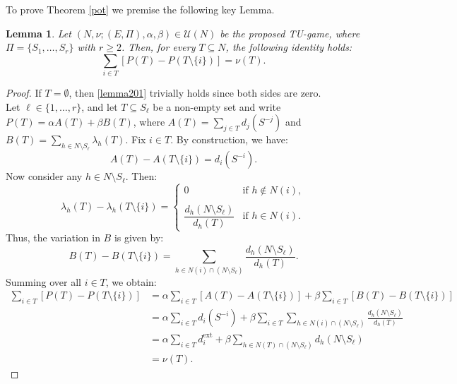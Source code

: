 \documentclass[preprint,11pt,authoryear]{elsarticle}
\theoremstyle{plain}
\newtheorem{lemma}[theorem]{Lemma}
\begin{document}
To prove Theorem \ref{pot} we premise the following 
key Lemma.
\begin{lemma}\label{lemmae2}
	Let \( (N, \nu; (E, \Pi), \alpha, \beta) \in \mathcal{U}(N) \) be the proposed TU-game, where \( \Pi = \{S_1, \dots, S_r\} \) with \( r \geq 2 \). Then, for every \( T \subseteq N \), the following identity holds:
	\begin{equation}
		\label{lemma201}
		\sum_{i \in T} \left[ P(T) - P(T \setminus \{i\}) \right] = \nu(T).
	\end{equation}
\end{lemma}
\begin{proof}
	If \( T = \emptyset \), then \eqref{lemma201} trivially holds since both sides are zero.\\
	Let \( \ell \in \{1, \dots, r\} \), and let \( T \subseteq S_\ell \) be a non-empty set and write $ P(T) = \alpha A(T) + \beta B(T)$, where $A(T) = \sum_{j \in T} d_j(S^{-j})$ and $B(T) = \sum_{h \in N \setminus S_\ell} \lambda_h(T)$. Fix \( i \in T \). By construction, we have:
	\[
	A(T) - A(T \setminus \{i\}) = d_i(S^{-i}).
	\]
	Now consider any \( h \in N \setminus S_\ell \). Then:
	\[
	\lambda_h(T) - \lambda_h(T \setminus \{i\}) =
	\begin{cases}
		0& \text{if } h \notin N(i), \\
		&\\
		\dfrac{d_h(N \setminus S_\ell)}{d_h(T)}& \text{if } h \in N(i).
	\end{cases}
	\]
	Thus, the variation in \( B \) is given by:
	\[
	B(T) - B(T \setminus \{i\}) = \sum_{h \in N(i) \cap (N \setminus S_\ell)} \frac{d_h(N \setminus S_\ell)}{d_h(T)}.
	\]
	Summing over all \( i \in T \), we obtain:
	\begin{equation}
		\label{lemma202}
		\begin{aligned}
			\sum_{i \in T} \left[ P(T) - P(T \setminus \{i\}) \right] &= 
			\alpha \sum_{i \in T} \left[ A(T) - A(T \setminus \{i\}) \right]
			+ \beta \sum_{i \in T} \left[ B(T) - B(T \setminus \{i\}) \right] \\
			&= \alpha \sum_{i \in T} d_i(S^{-i}) + 
			\beta \sum_{i \in T} \sum_{h \in N(i) \cap (N \setminus S_\ell)} \frac{d_h(N \setminus S_\ell)}{d_h(T)} \\
			&= \alpha \sum_{i \in T} d_i^{\text{ext}} +
			\beta \sum_{h \in N(T) \cap (N \setminus S_\ell)} d_h(N \setminus S_\ell) \\
			&= \nu(T).
		\end{aligned}
	\end{equation}

\end{proof}
\end{document}
